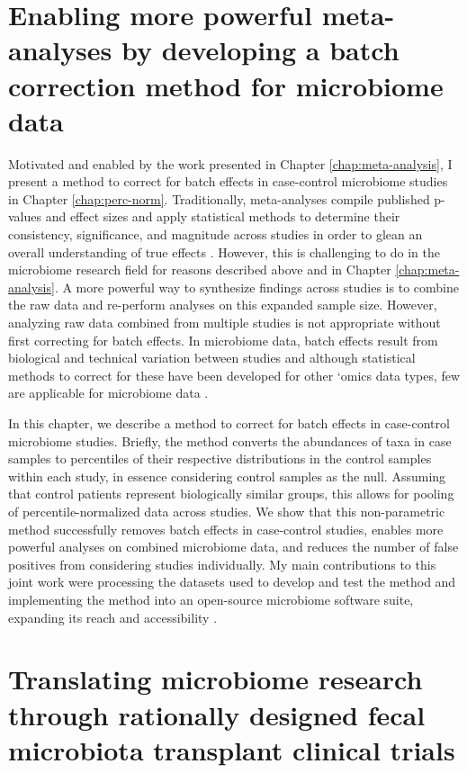 \section{Enabling more powerful meta-analyses by developing a batch correction method for microbiome data}

Motivated and enabled by the work presented in Chapter \ref{chap:meta-analysis}, I present a method to correct for batch effects in case-control microbiome studies in Chapter \ref{chap:perc-norm}.
Traditionally, meta-analyses compile published p-values and effect sizes and apply statistical methods to determine their consistency, significance, and magnitude across studies in order to glean an overall understanding of true effects \cite{glass-1976}.
However, this is challenging to do in the microbiome research field for reasons described above and in Chapter \ref{chap:meta-analysis}.
A more powerful way to synthesize findings across studies is to combine the raw data and re-perform analyses on this expanded sample size.
However, analyzing raw data combined from multiple studies is not appropriate without first correcting for batch effects.
In microbiome data, batch effects result from biological and technical variation between studies and although statistical methods to correct for these have been developed for other `omics data types, few are applicable for microbiome data \cite{gibbons-2018}.

In this chapter, we describe a method to correct for batch effects in case-control microbiome studies.
Briefly, the method converts the abundances of taxa in case samples to percentiles of their respective distributions in the control samples within each study, in essence considering control samples as the null.
Assuming that control patients represent biologically similar groups, this allows for pooling of percentile-normalized data across studies.
We show that this non-parametric method successfully removes batch effects in case-control studies, enables more powerful analyses on combined microbiome data, and reduces the number of false positives from considering studies individually.
My main contributions to this joint work were processing the datasets used to develop and test the method and implementing the method into an open-source microbiome software suite, expanding its reach and accessibility \cite{qiime2}.

\section{Translating microbiome research through rationally designed fecal microbiota transplant clinical trials}

